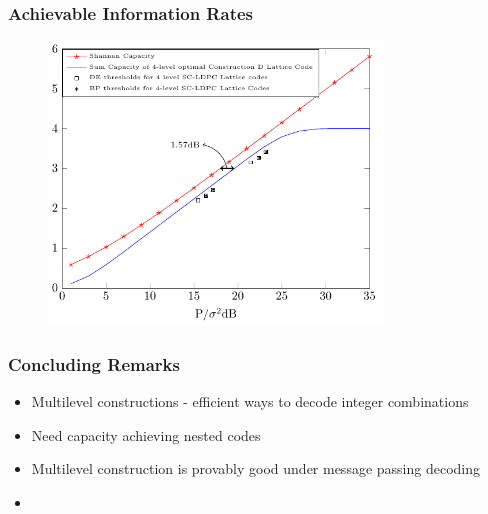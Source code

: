 \documentclass[10pt]{beamer}
\begin{document}
\begin{frame}\frametitle{Achievable Information Rates}
    \begin{figure}
        \begin{center}
            \includegraphics[width=3.5in]{ShapingLoss_Final_CTW}
        \end{center}
    \end{figure}
\end{frame}

\begin{frame}\frametitle{Concluding Remarks}
    \begin{itemize}
        \item Multilevel constructions - efficient ways to decode integer combinations
               \vspace{5pt}
        \item Need capacity achieving nested codes
                \vspace{5pt}
        \item Multilevel construction is provably good under message passing decoding
               \vspace{5pt}
               \pause
        \item {}
    \end{itemize}
\end{frame}
\end{document}
